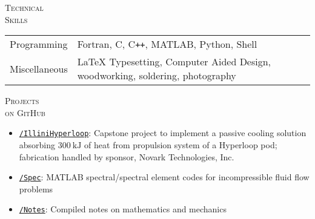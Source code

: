 \documentclass[10pt]{article}
\begin{document}
\vspace{-1.5em}
\begin{multicols}{2}
\textsc{\small Technical \\ Skills}
\columnbreak

\begin {table}[H]
\begin{tabular}{l l }
\hspace{-0.5em}Programming   & \hspace{-0.0em}Fortran, C, C\texttt{++}, MATLAB, Python, Shell\\
\hspace{-0.5em}Miscellaneous & \hspace{-0.0em}\LaTeX{} Typesetting, Computer Aided Design, woodworking, soldering, photography \\
\end{tabular}	
\end{table}

\vspace{-1.0em}
\end{multicols}
\vspace{-1.5em}
\begin{multicols}{2}
\textsc{\small Projects\\on GitHub}
\columnbreak

\vspace{-2.0em}
\begin{itemize}[label=-]
    \setlength{\itemindent}{-1.5em}
    \setlength\itemsep{-0.5\itemsep}
    \item \href{https://github.com/vpuri3/IlliniHyperloop}{\texttt{/IlliniHyperloop}}: Capstone project to implement a passive cooling solution absorbing $\SI{300}{\kilo \joule}$ of heat from propulsion system of a Hyperloop pod; fabrication handled by sponsor, Novark Technologies, Inc.
    \item \href{https://github.com/vpuri3/Spec}{\texttt{/Spec}}: MATLAB spectral/spectral element codes for incompressible fluid flow problems
    \item \href{https://github.com/vpuri3/Notes}{\texttt{/Notes}}: Compiled notes on mathematics and mechanics
\end{itemize}
\vspace{-2.0em}

\end{multicols}
\vspace{-1.5em}
\vfill
\end{document}
